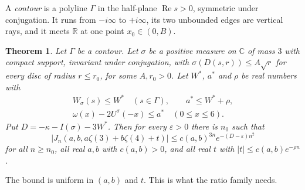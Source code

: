 \documentclass[11pt]{amsart}
\newtheorem{theorem}{Theorem}[section]
\theoremstyle{definition}
\theoremstyle{remark}
\numberwithin{equation}{section}
\newcommand{\R}{\mathbb R}
\newcommand{\C}{\mathbb C}
\begin{document}
A \emph{contour} is a polyline $\Gamma$ in the half-plane $\operatorname{Re}s>0$, symmetric under conjugation. It runs from
$-i\infty$ to $+i\infty$, its two unbounded edges are vertical rays, and it meets $\R$ at one point $x_0\in(0,B)$.

\begin{theorem}\label{thm:dual}
Let $\Gamma$ be a contour. Let $\sigma$ be a positive measure on $\C$ of mass $3$ with compact support, invariant
under conjugation, with
$\sigma(D(s,r))\le A\sqrt r$ for every disc of radius $r\le r_0$, for some $A,r_0>0$. Let $W^*$, $a^*$ and $\rho$ be
real numbers with
\begin{gather*}
 W_\sigma(s)\le W^*\quad(s\in\Gamma),\qquad a^*\le W^*+\rho,\\
 \omega(x)-2U^\sigma(-x)\le a^*\quad(0\le x\le6).
\end{gather*}
Put $D=-\kappa-I(\sigma)-3W^*$. Then for every $\varepsilon>0$ there is $n_0$ such that
\[
 |J_n(a,b,a\zeta(3)+b\zeta(4)+t)|\le c(a,b)^{3n}e^{-(D-\varepsilon)n^2}
\]
for all $n\ge n_0$, all real $a,b$ with $c(a,b)>0$, and all real $t$ with $|t|\le c(a,b)e^{-\rho n}$.
\end{theorem}

The bound is uniform in $(a,b)$ and $t$. This is what the ratio family needs.
\end{document}
